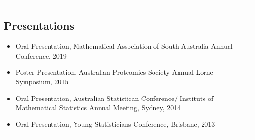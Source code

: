 \documentclass[a4paper,12pt]{report}
\begin{document}
\hrule


\subsection*{Presentations}          

\begin{itemize}
	\item Oral Presentation, Mathematical Association of South Australia Annual Conference, 2019
	\item Poster Presentation, Australian Proteomics Society Annual Lorne Symposium, 2015
	\item Oral Presentation, Australian Statistican Conference/ Institute of Mathematical Statistics Annual Meeting, Sydney, 2014
	\item Oral Presentation, Young Statisticians Conference, Brisbane, 2013
\end{itemize}


\hrule


%
%
%


%

\end{document}

